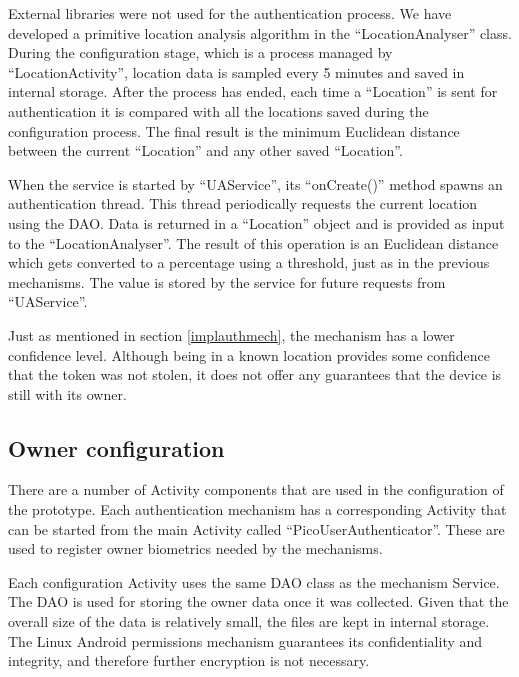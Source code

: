 External libraries were not used for the authentication process. We have developed a primitive location analysis algorithm in the ``LocationAnalyser'' class. During the configuration stage, which is a process managed by ``LocationActivity'', location data is sampled every 5 minutes and saved in internal storage. After the process has ended, each time a ``Location'' is sent for authentication it is compared with all the locations saved during the configuration process. The final result is the minimum Euclidean distance between the current ``Location'' and any other saved ``Location''. 

When the service is started by ``UAService'', its ``onCreate()'' method spawns an authentication thread. This thread periodically requests the current location using the DAO. Data is returned in a ``Location'' object and is provided as input to the ``LocationAnalyser''. The result of this operation is an Euclidean distance which gets converted to a percentage using a threshold, just as in the previous mechanisms. The value is stored by the service for future requests from ``UAService''.

Just as mentioned in section \ref{implauthmech}, the mechanism has a lower confidence level. Although being in a known location provides some confidence that the token was not stolen, it does not offer any guarantees that the device is still with its owner.

\subsection{Owner configuration}
There are a number of Activity components that are used in the configuration of the prototype. Each authentication mechanism has a corresponding Activity that can be started from the main Activity called ``PicoUserAuthenticator''. These are used to register owner biometrics needed by the mechanisms.

Each configuration Activity uses the same DAO class as the mechanism Service. The DAO is used for storing the owner data once it was collected. Given that the overall size of the data is relatively small, the files are kept in internal storage. The Linux Android permissions mechanism guarantees its confidentiality and integrity, and therefore further encryption is not necessary.

